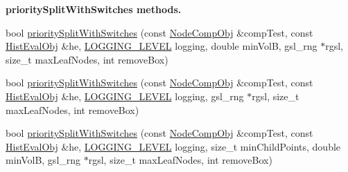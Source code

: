 \begin{Indent}{\bf priority\-Split\-With\-Switches methods.}
\begin{DoxyCompactItemize}
\item 
bool \hyperlink{classsubpavings_1_1AdaptiveHistogram_ad2ae1c64a519c1d5f32f81d39210b738}{priority\-Split\-With\-Switches} (const \hyperlink{classsubpavings_1_1NodeCompObj}{\-Node\-Comp\-Obj} \&comp\-Test, const \hyperlink{classsubpavings_1_1HistEvalObj}{\-Hist\-Eval\-Obj} \&he, \hyperlink{namespacesubpavings_aef8e51096b59ecaf1a1e9b2ee24b6089}{\-L\-O\-G\-G\-I\-N\-G\-\_\-\-L\-E\-V\-E\-L} logging, double min\-Vol\-B, gsl\-\_\-rng $\ast$rgsl, size\-\_\-t max\-Leaf\-Nodes, int remove\-Box)
\item 
bool \hyperlink{classsubpavings_1_1AdaptiveHistogram_af9317b285f9a4f2753b1c9099347fe6f}{priority\-Split\-With\-Switches} (const \hyperlink{classsubpavings_1_1NodeCompObj}{\-Node\-Comp\-Obj} \&comp\-Test, const \hyperlink{classsubpavings_1_1HistEvalObj}{\-Hist\-Eval\-Obj} \&he, \hyperlink{namespacesubpavings_aef8e51096b59ecaf1a1e9b2ee24b6089}{\-L\-O\-G\-G\-I\-N\-G\-\_\-\-L\-E\-V\-E\-L} logging, gsl\-\_\-rng $\ast$rgsl, size\-\_\-t max\-Leaf\-Nodes, int remove\-Box)
\item 
bool \hyperlink{classsubpavings_1_1AdaptiveHistogram_a6eb39e1e4524e415b8eff1ba4a4fc4b0}{priority\-Split\-With\-Switches} (const \hyperlink{classsubpavings_1_1NodeCompObj}{\-Node\-Comp\-Obj} \&comp\-Test, const \hyperlink{classsubpavings_1_1HistEvalObj}{\-Hist\-Eval\-Obj} \&he, \hyperlink{namespacesubpavings_aef8e51096b59ecaf1a1e9b2ee24b6089}{\-L\-O\-G\-G\-I\-N\-G\-\_\-\-L\-E\-V\-E\-L} logging, size\-\_\-t min\-Child\-Points, double min\-Vol\-B, gsl\-\_\-rng $\ast$rgsl, size\-\_\-t max\-Leaf\-Nodes, int remove\-Box)
\end{DoxyCompactItemize}
\end{Indent}
